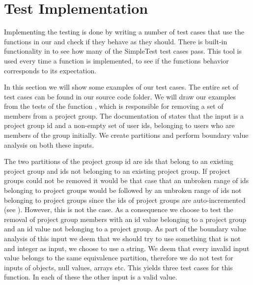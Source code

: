 \section{Test Implementation}
\label{sec:testimplementation}
Implementing the testing is done by writing a number of test cases that use the functions in our \subsystem{} and check if they behave as they should.
There is built-in functionality in \moodle{} to see how many of the SimpleTest test cases pass.
This tool is used every time a function is implemented, to see if the functions behavior corresponds to its expectation.

In this section we will show some examples of our test cases.
The entire set of test cases can be found in our source code folder.
We will draw our examples from the tests of the function , which is responsible for removing a set of members from a project group.
The documentation of  states that the input is a project group id and a non-empty set of user ids, belonging to users who are members of the group initially.
We create partitions and perform boundary value analysis on both these inputs.

The two partitions of the project group id are ids that belong to an existing project group and ids not belonging to an existing project group.
If project groups could not be removed it would be that case that an unbroken range of ids belonging to project groups would be followed by an unbroken range of ids not belonging to project groups since the ids of project groups are auto-incremented (see ).
However, this is not the case.
As a consequence we choose to test the removal of project group members with an id value belonging to a project group and an id value not belonging to a project group.
As part of the boundary value analysis of this input we deem that we should try to use something that is not and integer as input, we choose to use a string.
We deem that every invalid input value belongs to the same equivalence partition, therefore we do not test for inputs of objects, null values, arrays etc.
This yields three test cases for this function.
In each of these the other input is a valid value.



